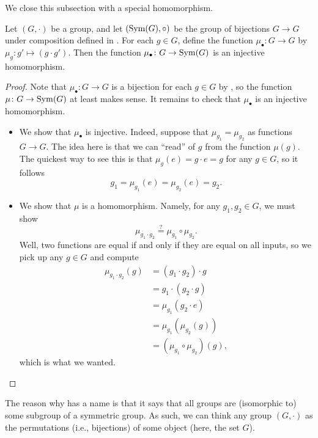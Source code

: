 \documentclass[../main.tex]{subfiles}
\begin{document}
We close this subsection with a special homomorphism.
\begin{theorem}[Cayley] \label{thm:cayley}
    Let $(G,\cdot)$ be a group, and let $(\operatorname{Sym}(G),\circ)$ be the group of bijections $G\to G$ under composition defined in . For each $g\in G$, define the function $\mu_\bullet\colon G\to G$ by $\mu_g\colon g'\mapsto(g\cdot g')$. Then the function $\mu_\bullet\colon G\to\operatorname{Sym}(G)$ is an injective homomorphism.
\end{theorem}
\begin{proof}
    Note that $\mu_\bullet\colon G\to G$ is a bijection for each $g\in G$ by , so the function $\mu\colon G\to\operatorname{Sym}(G)$ at least makes sense. It remains to check that $\mu_\bullet$ is an injective homomorphism.
    \begin{itemize}
        \item We show that $\mu_\bullet$ is injective. Indeed, suppose that $\mu_{g_1}=\mu_{g_2}$ as functions $G\to G$. The idea here is that we can ``read'' of $g$ from the function $\mu(g)$. The quickest way to see this is that $\mu_g(e)=g\cdot e=g$ for any $g\in G$, so it follows
        \[g_1=\mu_{g_1}(e)=\mu_{g_2}(e)=g_2.\]
        \item We show that $\mu$ is a homomorphism. Namely, for any $g_1,g_2\in G$, we must show
        \[\mu_{g_1\cdot g_2}\stackrel?=\mu_{g_1}\circ\mu_{g_2}.\]
        Well, two functions are equal if and only if they are equal on all inputs, so we pick up any $g\in G$ and compute
        \begin{align*}
            \mu_{g_1\cdot g_2}(g) &= (g_1\cdot g_2)\cdot g \\
            &= g_1\cdot(g_2\cdot g) \\
            &= \mu_{g_1}(g_2\cdot e) \\
            &= \mu_{g_1}(\mu_{g_2}(g)) \\
            &= (\mu_{g_1}\circ\mu_{g_2})(g),
        \end{align*}
        which is what we wanted.
        \qedhere
    \end{itemize}
\end{proof}
\begin{remark}
    The reason why  has a name is that it says that all groups are (isomorphic to) some subgroup of a symmetric group. As such, we can think any group $(G,\cdot)$ as the permutations (i.e., bijections) of some object (here, the set $G$).
\end{remark}
\end{document}
